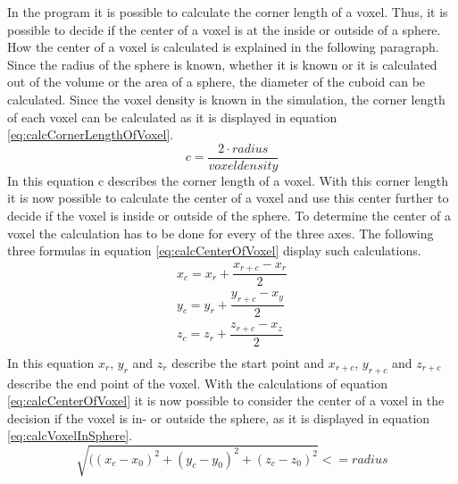 In the program it is possible to calculate the corner length of a voxel. Thus, it is possible to decide if the center of a voxel is at the inside or outside of a sphere. How the center of a voxel is calculated is explained in the following paragraph. \newline
Since the radius of the sphere is known, whether it is known or it is calculated out of the volume or the area of a sphere, the diameter of the cuboid can be calculated. Since the voxel density is known in the simulation, the corner length of each voxel can be calculated as it is displayed in equation \ref{eq:calcCornerLengthOfVoxel}.
\begin{equation}\label{eq:calcCornerLengthOfVoxel}
c = \dfrac{2 \cdot radius}{voxel density}
\end{equation}
In this equation c describes the corner length of a voxel. With this corner length it is now possible to calculate the center of a voxel and use this center further to decide if the voxel is inside or outside of the sphere. To determine the center of a voxel the calculation has to be done for every of the three axes. The following three formulas in equation \ref{eq:calcCenterOfVoxel} display such calculations. 
\begin{equation}\label{eq:calcCenterOfVoxel}
\begin{split}
x_{c} = x_{r} + \dfrac{x_{r+c} - x_{r}}{2} \\
y_{c} = y_{r} + \dfrac{y_{r+c} - x_{y}}{2} \\
z_{c} = z_{r} + \dfrac{z_{r+c} - x_{z}}{2} \\
\end{split}
\end{equation}
In this equation $x_{r}$, $y_{r}$ and $z_{r}$ describe the start point and $x_{r+c}$, $y_{r+c}$ and $z_{r+c}$ describe the end point of the voxel.
With the calculations of equation \ref{eq:calcCenterOfVoxel} it is now possible to consider the center of a voxel in the decision if the voxel is in- or outside the sphere, as it is displayed in equation \ref{eq:calcVoxelInSphere}.
\begin{equation}\label{eq:calcVoxelInSphere}
\sqrt{((x_{c} - x_{0})^{2} + (y_{c} - y_{0})^{2} + (z_{c} -z_{0})^{2}} <= radius
\end{equation}




